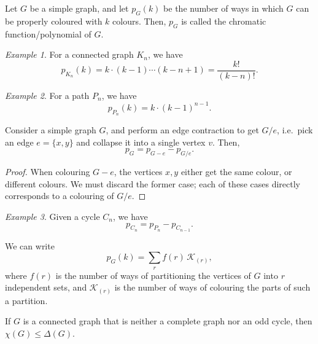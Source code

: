 \documentclass[11pt]{article}
\theoremstyle{definition}
\theoremstyle{remark}
\newtheorem*{example}{Example}
\numberwithin{equation}{section}
\begin{document}
    \begin{definition}
        Let $G$ be a simple graph, and let $p_G(k)$ be the number of ways in which
        $G$ can be properly coloured with $k$ colours. Then, $p_G$ is called the
        chromatic function/polynomial of $G$.
    \end{definition}
    \begin{example}
        For a connected graph $K_n$, we have \[
            p_{K_n}(k) = k \cdot (k - 1) \cdots (k - n + 1) =
            \frac{k!}{(k - n)!}.
        \] 
    \end{example}
    \begin{example}
        For a path $P_n$, we have \[
            p_{P_n}(k) = k\cdot (k - 1)^{n - 1}.
        \] 
    \end{example}

    \begin{theorem}
        Consider a simple graph $G$, and perform an edge contraction to get $G/e$,
        i.e.\ pick an edge $e = \{x, y\}$ and collapse it into a single vertex $v$.
        Then,
        \[
            p_G = p_{G - e} - p_{G / e}.
        \] 
    \end{theorem}
    \begin{proof}
        When colouring $G - e$, the vertices $x, y$ either get the same colour, or
        different colours. We must discard the former case; each of these cases
        directly corresponds to a colouring of $G / e$.
    \end{proof}

    \begin{example}
        Given a cycle $C_n$, we have \[
            p_{C_n} = p_{P_n} - p_{C_{n - 1}}.
        \] 
    \end{example}

    \begin{theorem}
        We can write \[
            p_G(k) = \sum_r f(r)\, \mathcal{K}_{(r)},
        \] where $f(r)$ is the number of ways of partitioning the vertices of $G$
        into $r$ independent sets, and $\mathcal{K}_{(r)}$ is the number of ways of
        colouring the parts of such a partition.
    \end{theorem}

    \begin{theorem}[Brook]
        If $G$ is a connected graph that is neither a complete graph nor an odd
        cycle, then $\chi(G) \leq \Delta(G)$.
    \end{theorem}
\end{document}
